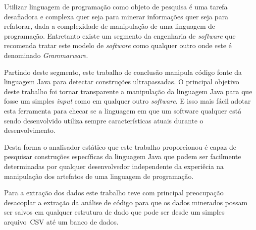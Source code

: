 Utilizar linguagem de programa\c{c}\~{a}o como objeto de pesquisa \'{e} uma tarefa desafiadora e complexa quer seja para minerar informa\c{c}\~{o}es quer seja para refatorar, dada a complexidade de manipula\c{c}\~{a}o de uma linguagem de programa\c{c}\~{a}o. Entretanto existe um segmento da engenharia de \textit{software} que recomenda tratar este modelo de \textit{software} como qualquer outro onde este \'{e} denominado \textit{Grammarware}. 

Partindo deste segmento, este trabalho de conclus\~{a}o manipula c\'{o}digo fonte da linguagem Java para detectar constru\c{c}\~{o}es ultrapassadas. O principal objetivo deste trabalho foi tornar transparente a manipula\c{c}\~{a}o da linguagem Java para que fosse um simples \textit{input} como em qualquer outro \textit{software}. E isso mais f\'{a}cil adotar esta ferramenta para checar se a linguagem em que um software qualquer est\'{a} sendo desenvolvido utiliza sempre caracter\'{i}sticas atuais durante o desenvolvimento.

Desta forma o analisador est\'{a}tico que este trabalho proporcionou \'{e} capaz de pesquisar constru\c{c}\~{o}es espec\'{i}ficas da linguagem Java que podem ser facilmente determinadas por qualquer desenvolvedor independente da experi\^{e}cia na manipula\c{c}\~{a}o dos artefatos de uma linguagem de programa\c{c}\~{a}o.

Para a extra\c{c}\~{a}o dos dados este trabalho teve com principal preocupa\c{c}\~{a}o desacoplar a extra\c{c}\~{a}o da an\'{a}lise de c\'{o}digo para que os dados minerados possam ser salvos em qualquer estrutura de dado que pode ser desde um simples arquivo~\acs{CSV} at\'{e} um banco de dados.




